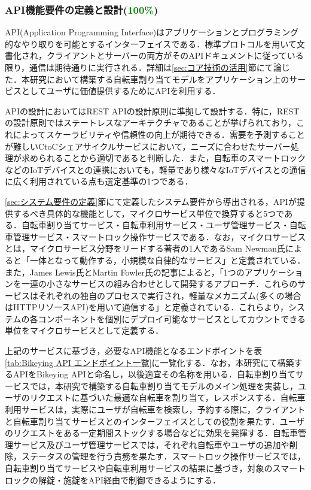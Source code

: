       \subsubsection{API機能要件の定義と設計(\textcolor{green}{100\%})}
        \label{sec:API機能要件の定義と設計}
          \par API(Application Programming Interface)はアプリケーションとプログラミング的なやり取りを可能とするインターフェイスである．標準プロトコルを用いて文書化され，クライアントとサーバーの両方がそのAPIドキュメントに従っている限り，通信は期待通りに実行される．詳細は\ref{sec:コア技術の活用}節にて論じた．本研究において構築する自転車割り当てモデルをアプリケーション上のサービスとしてユーザに価値提供するためにAPIを利用する．
          \par APIの設計においてはREST APIの設計原則に準拠して設計する．特に，RESTの設計原則ではステートレスなアーキテクチャであることが挙げられており，これによってスケーラビリティや信頼性の向上が期待できる．需要を予測することが難しいCtoCシェアサイクルサービスにおいて，ニーズに合わせたサーバー処理が求められることから適切であると判断した．また，自転車のスマートロックなどのIoTデバイスとの連携においても，軽量であり様々なIoTデバイスとの通信に広く利用されている点も選定基準の1つである．
          \par \ref{sec:システム要件の定義}節にて定義したシステム要件から導出される，APIが提供するべき具体的な機能として，マイクロサービス単位で換算すると5つである．自転車割り当てサービス・自転車利用サービス・ユーザ管理サービス・自転車管理サービス・スマートロック操作サービスである．なお，マイクロサービスとは，マイクロサービス分野をリードする著者の1人であるSam Newman氏によると「一体となって動作する，小規模な自律的なサービス」と定義されている．また，James Lewis氏とMartin Fowler氏の記事によると，「1つのアプリケーションを一連の小さなサービスの組み合わせとして開発するアプローチ．これらのサービスはそれぞれの独自のプロセスで実行され，軽量なメカニズム(多くの場合はHTTPリソースAPI)を用いて通信する」と定義されている．これらより，システムの各コンポーネントを個別にデプロイ可能なサービスとしてカウントできる単位をマイクロサービスとして定義する．
          \par 上記のサービスに基づき，必要なAPI機能となるエンドポイントを表\ref{tab:Bikeying API エンドポイント一覧}に一覧化する．なお，本研究にて構築するAPIをBikeying APIと命名し，以後適宜その名称を用いる．自転車割り当てサービスでは，本研究で構築する自転車割り当てモデルのメイン処理を実装し，ユーザのリクエストに基づいた最適な自転車を割り当て，レスポンスする．自転車利用サービスは，実際にユーザが自転車を検索し，予約する際に，クライアントと自転車割り当てサービスとのインターフェイスとしての役割を果たす．ユーザのリクエストをある一定期間ストックする場合などに効果を発揮する．自転車管理サービス及びユーザ管理サービスでは，それぞれ自転車やユーザの追加や削除，ステータスの管理を行う責務を果たす．スマートロック操作サービスでは，自転車割り当てサービスや自転車利用サービスの結果に基づき，対象のスマートロックの解錠・施錠をAPI経由で制御できるようにする．

